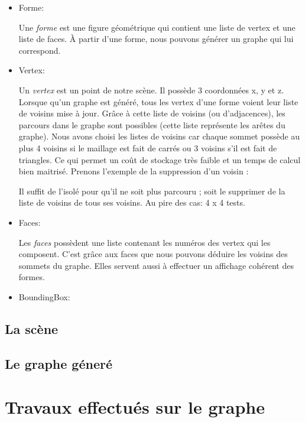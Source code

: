 \documentclass[a4paper,12pt]{report}
\begin{document}
\begin{itemize}
 \item Forme:

Une \textit{forme} est une figure géométrique qui contient une liste de vertex et une liste de faces. À partir d'une forme, nous pouvons générer un graphe qui lui correspond.
 
 \item Vertex:

Un \textit{vertex} est un point de notre scène. Il possède 3 coordonnées x, y et z. Lorsque qu'un graphe est généré, tous les vertex d'une forme voient leur liste de voisins mise à jour. Grâce à cette liste de voisins (ou d'adjacences), les parcours dans le graphe sont possibles (cette liste
représente les arêtes du graphe). Nous avons choisi les listes de voisins car chaque sommet possède au plus 4 voisins si le maillage est fait de carrés ou 3 voisins s'il est fait de triangles. Ce qui permet un coût de stockage très faible et un temps de calcul bien maitrisé. Prenons l'exemple de la suppression d'un voisin :

Il suffit de l'isolé pour qu'il ne soit plus parcouru ; soit le supprimer de la liste de voisins de tous ses voisins. Au pire des cas: 4 x 4 tests.
 
 \item Faces:

Les \textit{faces} possèdent une liste contenant les numéros des vertex qui les composent. C'est grâce aux faces que nous pouvons déduire les voisins des sommets du graphe. Elles servent aussi à effectuer un affichage cohérent des formes.

  \item BoundingBox:

\end{itemize}




\subsection{La scène}

\subsection{Le graphe géneré}

\section{Travaux effectués sur le graphe}
\end{document}
